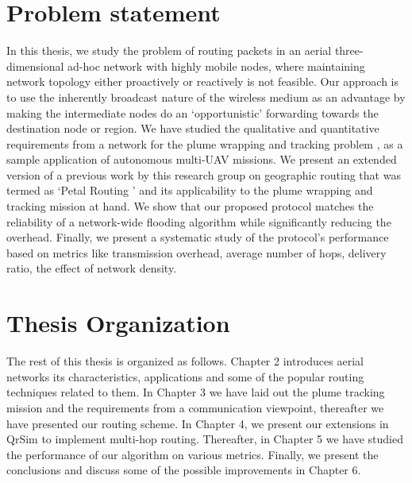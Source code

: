 \section{Problem statement}

In this thesis, we study the problem of routing packets in an aerial three-dimensional ad-hoc network with highly mobile nodes, where maintaining network topology either proactively or reactively is not feasible. Our approach is to use the inherently broadcast nature of the wireless medium as an advantage by making the intermediate nodes do an `opportunistic' forwarding towards the destination node or region. We have studied the qualitative and quantitative requirements from a network for the plume wrapping and tracking problem \cite{8080382}, as a sample application of autonomous multi-UAV missions. We present an extended version of a previous work by this research group on geographic routing that was termed as `Petal Routing \cite{6133499}' and its applicability to the plume wrapping and tracking mission at hand. We show that our proposed protocol matches the reliability of a network-wide flooding algorithm while significantly reducing the overhead. Finally, we present a systematic study of the protocol's performance based on metrics like transmission overhead, average number of hops, delivery ratio, the effect of network density.


\section{Thesis Organization} 

The rest of this thesis is organized as follows. Chapter 2 introduces aerial networks its characteristics, applications and some of the popular routing techniques related to them. In Chapter 3 we have laid out the plume tracking mission and the requirements from a communication viewpoint, thereafter we have presented our routing scheme. In Chapter 4, we present our extensions in QrSim to implement multi-hop routing. Thereafter, in Chapter 5 we have studied the performance of our algorithm on various metrics. Finally, we present the conclusions and discuss some of the possible improvements in Chapter 6.